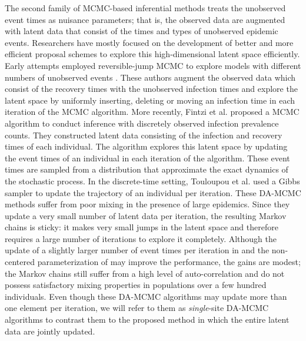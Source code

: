 \documentclass[11pt]{article}
\begin{document}
	The second family of MCMC-based inferential methods treats the unobserved event times as nuisance parameters; that is, the observed data are augmented with latent data that consist of the times and types of unobserved epidemic events.
	Researchers have mostly focused on the development of better and more efficient proposal schemes to explore this high-dimensional latent space efficiently. Early attempts employed reversible-jump MCMC \cite{Green.1995} to explore models with different numbers of unobserved events \cite{Gibson.1998, ONeill.1999}. These authors augment the observed data which consist of the recovery times with the unobserved infection times and explore the latent space by uniformly inserting, deleting or moving an infection time in each iteration of the MCMC algorithm. 
	More recently, Fintzi et al. \cite{Fintzi.2017} proposed a MCMC algorithm to conduct inference with discretely observed infection prevalence counts. They constructed latent data consisting of the infection and recovery times of each individual. The algorithm explores this latent space by updating the event times of an individual in each iteration of the algorithm. These event times are sampled from a distribution that approximate the exact dynamics of the stochastic process.
	In the discrete-time setting, Touloupou et al. \cite{Touloupou.2020} used a Gibbs sampler to update the trajectory of an individual per iteration.
	These DA-MCMC methods suffer from poor mixing in the presence of large epidemics. Since they update a very small number of latent data per iteration, the resulting Markov chains is sticky: it makes very small jumps in the latent space and therefore requires a large number of iterations to explore it completely.
	Although the update of a slightly larger number of event times per iteration in \cite{Pooley.2015} and the non-centered parameterization of \cite{Neal.2005} may improve the performance, the gains are modest; the Markov chains still suffer from a high level of auto-correlation and do not possess satisfactory mixing properties in populations over a few hundred individuals.
	Even though these DA-MCMC algorithms may update more than one element per iteration, we will refer to them as \textit{single}-site DA-MCMC algorithms to contrast them to the proposed method in which the entire latent data are jointly updated.
	
	
\end{document}

